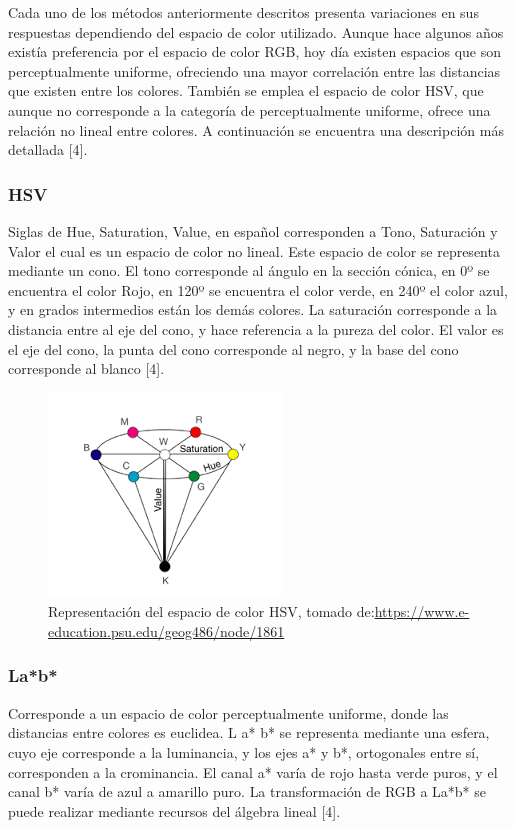 \documentclass[10pt,twocolumn,letterpaper]{article}
\begin{document}
Cada uno de los métodos anteriormente descritos presenta variaciones en sus respuestas dependiendo del espacio de color utilizado. Aunque hace algunos años existía preferencia por el espacio de color RGB, hoy día existen espacios que son perceptualmente uniforme, ofreciendo una mayor correlación entre las distancias que existen entre los colores. También se emplea el espacio de color HSV, que aunque no corresponde a la categoría de perceptualmente uniforme, ofrece una relación no lineal entre colores. A continuación se encuentra una descripción más detallada [4].

\subsubsection*{ HSV}
Siglas de Hue, Saturation, Value, en español corresponden a Tono, Saturación y Valor el cual es un espacio de color no lineal. Este espacio de color se representa mediante un cono. El tono corresponde al ángulo en la sección cónica, en 0º se encuentra el color Rojo, en 120º se encuentra el color verde, en 240º el color azul, y en grados intermedios están los demás colores.  La saturación corresponde a la distancia entre al eje del cono, y hace referencia a la pureza del color. El valor es el eje del cono, la punta del cono corresponde al negro, y la base del cono corresponde al blanco [4].
 \begin{figure}[H]
\begin{center}
   \includegraphics[scale = 0.65]{images}
\end{center}
   \caption{Representación del espacio de color HSV, tomado de:\url{https://www.e-education.psu.edu/geog486/node/1861} }
\end{figure}

\subsubsection*{ La*b*}
Corresponde a un espacio de color perceptualmente uniforme, donde las distancias entre colores es euclidea. L a* b* se representa mediante una esfera, cuyo eje corresponde a la luminancia, y los ejes a* y b*, ortogonales entre sí, corresponden a la crominancia. El canal a* varía de rojo hasta verde puros, y el canal b* varía de azul a amarillo puro.  La transformación de RGB a La*b* se puede realizar mediante recursos del álgebra lineal [4].
\end{document}
